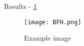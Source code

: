 Results - \ref{fig: a black image}

\begin{figure}[h]
    \centering
    \texttt{[image: BFH.png]}
    \caption{Example image}
    \label{fig: a black image}
\end{figure}
